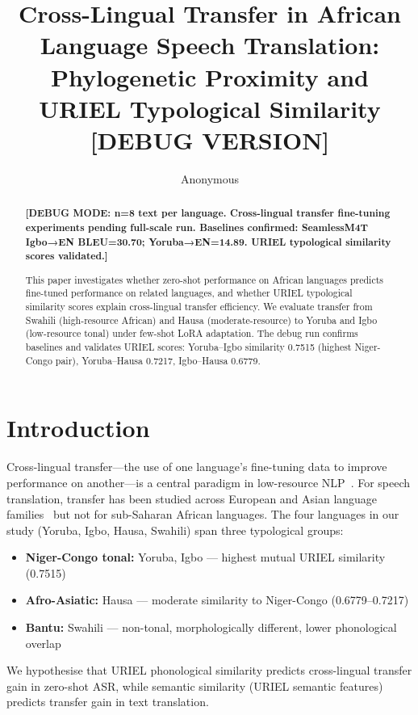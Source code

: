 \documentclass[11pt,a4paper]{article}
\title{Cross-Lingual Transfer in African Language Speech Translation:\\
Phylogenetic Proximity and URIEL Typological Similarity [DEBUG VERSION]}
\author{Anonymous}
\date{}
\begin{document}
\maketitle

\begin{abstract}
\textbf{[DEBUG MODE: n=8 text per language. Cross-lingual transfer fine-tuning experiments pending full-scale run. Baselines confirmed: SeamlessM4T Igbo→EN BLEU=30.70; Yoruba→EN=14.89. URIEL typological similarity scores validated.]}

This paper investigates whether zero-shot performance on African languages predicts fine-tuned performance on related languages, and whether URIEL typological similarity scores explain cross-lingual transfer efficiency. We evaluate transfer from Swahili (high-resource African) and Hausa (moderate-resource) to Yoruba and Igbo (low-resource tonal) under few-shot LoRA adaptation. The debug run confirms baselines and validates URIEL scores: Yoruba–Igbo similarity 0.7515 (highest Niger-Congo pair), Yoruba–Hausa 0.7217, Igbo–Hausa 0.6779.
\end{abstract}

\section{Introduction}
\label{sec:intro}

Cross-lingual transfer—the use of one language's fine-tuning data to improve performance on another—is a central paradigm in low-resource NLP~\citep{hu2020xtreme}. For speech translation, transfer has been studied across European and Asian language families~\citep{li2020multilingual} but not for sub-Saharan African languages. The four languages in our study (Yoruba, Igbo, Hausa, Swahili) span three typological groups:
\begin{itemize}
  \item \textbf{Niger-Congo tonal:} Yoruba, Igbo — highest mutual URIEL similarity (0.7515)
  \item \textbf{Afro-Asiatic:} Hausa — moderate similarity to Niger-Congo (0.6779–0.7217)
  \item \textbf{Bantu:} Swahili — non-tonal, morphologically different, lower phonological overlap
\end{itemize}

We hypothesise that URIEL phonological similarity predicts cross-lingual transfer gain in zero-shot ASR, while semantic similarity (URIEL semantic features) predicts transfer gain in text translation.
\end{document}
